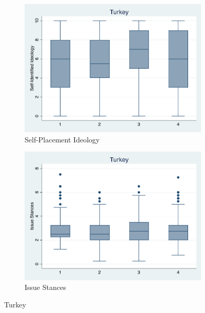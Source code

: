 \documentclass[12pt, titlepage]{article}
\begin{document}
\begin{figure}[H]
	\centering
	\begin{subfigure}[b]{0.475\textwidth}   
		\centering 
		\includegraphics[width=\textwidth]{IdeoBP/Turkey}
		\caption{Self-Placement Ideology}
	\end{subfigure}
	\hfill
	\begin{subfigure}[b]{0.475\textwidth}
		\centering 
		\includegraphics[width=\textwidth]{BoxLib/Turkey}
		\caption{Issue Stances}
	\end{subfigure}
	\caption{Turkey}
	\label{Turkey}
\end{figure}
\end{document}

